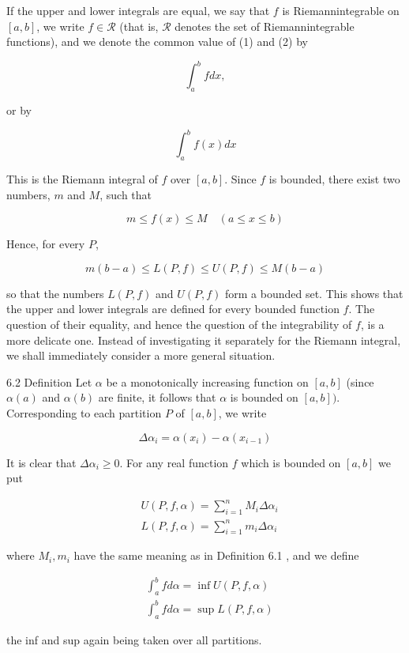\documentclass[10pt]{article}
\begin{document}
If the upper and lower integrals are equal, we say that $f$ is Riemannintegrable on $[a, b]$, we write $f \in \mathscr{R}$ (that is, $\mathscr{R}$ denotes the set of Riemannintegrable functions), and we denote the common value of (1) and (2) by

$$
\int_{a}^{b} f d x,
$$

or by

$$
\int_{a}^{b} f(x) d x
$$

This is the Riemann integral of $f$ over $[a, b]$. Since $f$ is bounded, there exist two numbers, $m$ and $M$, such that

$$
m \leq f(x) \leq M \quad(a \leq x \leq b)
$$

Hence, for every $P$,

$$
m(b-a) \leq L(P, f) \leq U(P, f) \leq M(b-a)
$$

so that the numbers $L(P, f)$ and $U(P, f)$ form a bounded set. This shows that the upper and lower integrals are defined for every bounded function $f$. The question of their equality, and hence the question of the integrability of $f$, is a more delicate one. Instead of investigating it separately for the Riemann integral, we shall immediately consider a more general situation.

6.2 Definition Let $\alpha$ be a monotonically increasing function on $[a, b]$ (since $\alpha(a)$ and $\alpha(b)$ are finite, it follows that $\alpha$ is bounded on $[a, b])$. Corresponding to each partition $P$ of $[a, b]$, we write

$$
\Delta \alpha_{i}=\alpha\left(x_{i}\right)-\alpha\left(x_{i-1}\right)
$$

It is clear that $\Delta \alpha_{i} \geq 0$. For any real function $f$ which is bounded on $[a, b]$ we put

$$
\begin{aligned}
& U(P, f, \alpha)=\sum_{i=1}^{n} M_{i} \Delta \alpha_{i} \\
& L(P, f, \alpha)=\sum_{i=1}^{n} m_{i} \Delta \alpha_{i}
\end{aligned}
$$

where $M_{i}, m_{i}$ have the same meaning as in Definition 6.1 , and we define

$$
\begin{aligned}
& \int_{a}^{b} f d \alpha=\inf U(P, f, \alpha) \\
& \int_{a}^{b} f d \alpha=\sup L(P, f, \alpha)
\end{aligned}
$$

the inf and sup again being taken over all partitions.
\end{document}
